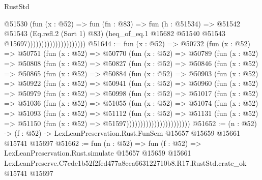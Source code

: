 \begin{lexlean}{RustStd}
\begin{coremodule}
                                        @51530
                                          (fun (x : @52) =>
                                          fun (fn : @83) =>
                                          fun (h : @51534) =>
                                          @51542
                                            @51543
                                            (Eq.refl.{2} (Sort 1) @83)
                                            (heq_of_eq.{1}
                                              @15682
                                              @51540
                                              @51543
                                              @15697)))))))))))))))))))))
@51644 := fun (x : @52) =>
  @50732
    (fun (x : @52) =>
    @50751
      (fun (x : @52) =>
      @50770
        (fun (x : @52) =>
        @50789
          (fun (x : @52) =>
          @50808
            (fun (x : @52) =>
            @50827
              (fun (x : @52) =>
              @50846
                (fun (x : @52) =>
                @50865
                  (fun (x : @52) =>
                  @50884
                    (fun (x : @52) =>
                    @50903
                      (fun (x : @52) =>
                      @50922
                        (fun (x : @52) =>
                        @50941
                          (fun (x : @52) =>
                          @50960
                            (fun (x : @52) =>
                            @50979
                              (fun (x : @52) =>
                              @50998
                                (fun (x : @52) =>
                                @51017
                                  (fun (x : @52) =>
                                  @51036
                                    (fun (x : @52) =>
                                    @51055
                                      (fun (x : @52) =>
                                      @51074
                                        (fun (x : @52) =>
                                        @51093
                                          (fun (x : @52) =>
                                          @51112
                                            (fun (x : @52) =>
                                            @51131
                                              (fun (x : @52) =>
                                              @51150 (fun (x : @52) => @51597)))))))))))))))))))))))
@51652 := (n : @52) ->
  (f : @52) -> LexLeanPreservation.Rust.FunSem @15657 @15659 @15661 @15741 @15697
@51662 := fun (n : @52) =>
  fun (f : @52) =>
  LexLeanPreservation.Rust.simulate
    @15657
    @15659
    @15661
    LexLeanPreserve.C7cde1b52f2fed477a8cca663122710b8.R17.RustStd.crate_ok
    @15741
    @15697
\end{coremodule}
\end{lexlean}
